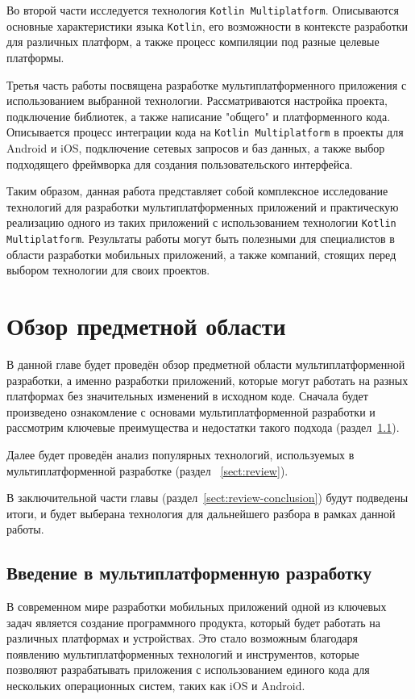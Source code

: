 \documentclass[14pt, russian]{scrartcl}
\begin{document}
Во второй части исследуется технология \texttt{Kotlin Multiplatform}. Описываются основные характеристики языка \texttt{Kotlin}, его возможности в контексте разработки для различных платформ, а также процесс компиляции под разные целевые платформы.

Третья часть работы посвящена разработке мультиплатформенного приложения с использованием выбранной технологии. Рассматриваются настройка проекта, подключение библиотек, а также написание "общего"{} и платформенного кода. Описывается процесс интеграции кода на \texttt{Kotlin Multiplatform} в проекты для Android и iOS, подключение сетевых запросов и баз данных, а также выбор подходящего фреймворка для создания пользовательского интерфейса.

Таким образом, данная работа представляет собой комплексное исследование технологий для разработки мультиплатформенных приложений и практическую реализацию одного из таких приложений с использованием технологии \texttt{Kotlin Multiplatform}. Результаты работы могут быть полезными для специалистов в области разработки мобильных приложений, а также компаний, стоящих перед выбором технологии для своих проектов.

\section{Обзор предметной области}

В данной главе будет проведён обзор предметной области мультиплатформенной разработки, а именно разработки приложений, которые могут работать на разных платформах без значительных изменений в исходном коде. Сначала будет произведено ознакомление с основами мультиплатформенной разработки и рассмотрим ключевые преимущества и недостатки такого подхода (раздел~\ref{sect:intro}).

Далее будет проведён анализ популярных технологий, используемых в мультиплатформенной разработке (раздел ~\ref{sect:review}).

В заключительной части главы (раздел~\ref{sect:review-conclusion}) будут подведены итоги, и будет выберана технология для дальнейшего разбора в рамках данной работы.

\subsection{Введение в мультиплатформенную разработку}\label{sect:intro}

В современном мире разработки мобильных приложений одной из ключевых задач является создание программного продукта, который будет работать на различных платформах и устройствах. Это стало возможным благодаря появлению мультиплатформенных технологий и инструментов, которые позволяют разрабатывать приложения с использованием единого кода для нескольких операционных систем, таких как iOS и Android.
\end{document}
